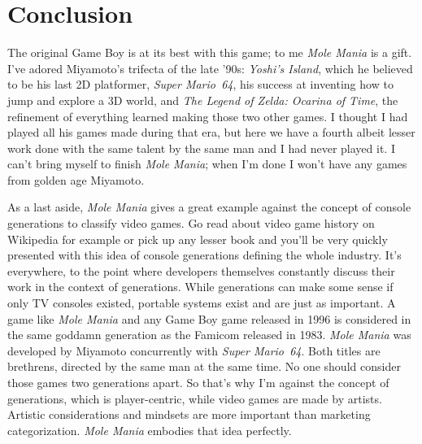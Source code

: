 \documentclass{book}
\begin{document}
\FloatBarrier\needspace{10mm}\section*{Conclusion}\nopagebreak[4]
The original Game Boy is at its best with this game; to me \emph{Mole Mania} is a gift. I’ve adored Miyamoto’s trifecta of the late ’90s: \emph{Yoshi’s Island}, which he believed to be his last 2D platformer, \emph{Super Mario 64}, his success at inventing how to jump and explore a 3D world, and \emph{The Legend of Zelda: Ocarina of Time}, the refinement of everything learned making those two other games. I thought I had played all his games made during that era, but here we have a fourth albeit lesser work done with the same talent by the same man and I had never played it. I can’t bring myself to finish \emph{Mole Mania}; when I’m done I won’t have any games from golden age Miyamoto.

As a last aside, \emph{Mole Mania} gives a great example against the concept of console generations to classify video games. Go read about video game history on Wikipedia for example or pick up any lesser book and you’ll be very quickly presented with this idea of console generations defining the whole industry. It’s everywhere, to the point where developers themselves constantly discuss their work in the context of generations. While generations can make some sense if only TV consoles existed, portable systems exist and are just as important. A game like \emph{Mole Mania} and any Game Boy game released in 1996 is considered in the same goddamn generation as the Famicom released in 1983. \emph{Mole Mania} was developed by Miyamoto concurrently with \emph{Super Mario 64}. Both titles are brethrens, directed by the same man at the same time. No one should consider those games two generations apart. So that’s why I’m against the concept of generations, which is player-centric, while video games are made by artists. Artistic considerations and mindsets are more important than marketing categorization. \emph{Mole Mania} embodies that idea perfectly.
\end{document}
